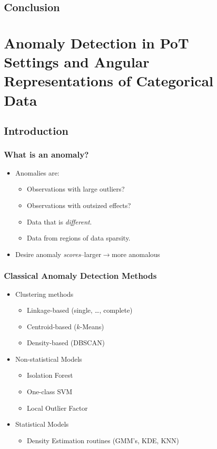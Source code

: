 \documentclass[aspectratio=169,10pt]{beamer}
\begin{document}
\subsection{Conclusion}

\section[Anomaly Detection]{Anomaly Detection in PoT Settings and Angular Representations of Categorical Data}
\subsection{Introduction}

\begin{frame}
  \frametitle{What is an anomaly?}
  \begin{itemize}
    \item Anomalies are:
      \begin{itemize}
        \item Observations with large outliers?
        \item Observations with outsized effects?
        \item Data that is \emph{different}.
        \item Data from regions of data sparsity.
      \end{itemize}
    \item Desire anomaly \emph{scores}--larger$\rightarrow$more anomalous
  \end{itemize}
\end{frame} %

\begin{frame}
  \frametitle{Classical Anomaly Detection Methods}
  \begin{itemize}
    \item Clustering methods
      \begin{itemize}
        \item Linkage-based (single, \dots, complete)~\citep{ackerman2010}
        \item Centroid-based ($k$-Means)~\citep{hartigan1979} 
        \item Density-based (DBSCAN)~\citep{ester1996}
      \end{itemize}
    \item Non-statistical Models
      \begin{itemize}
        \item Isolation Forest~\citep{liu2000}
        \item One-class SVM~\citep{chang2011}
        \item Local Outlier Factor~\citep{breunig2000}
      \end{itemize}
    \item Statistical Models
      \begin{itemize}
        \item Density Estimation routines (GMM's, KDE, KNN)
      \end{itemize}
  \end{itemize}
\end{frame} %
\end{document}
